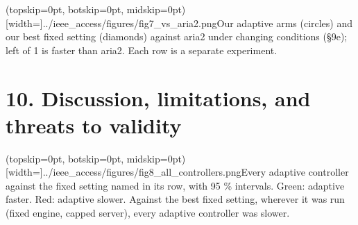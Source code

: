 \documentclass{ieeeaccess}
\begin{document}
\Figure[t!](topskip=0pt, botskip=0pt, midskip=0pt)[width=\columnwidth]{../ieee_access/figures/fig7_vs_aria2.png}{Our adaptive arms (circles) and our best fixed setting (diamonds) against aria2 under changing conditions (§9e); left of 1 is faster than aria2. Each row is a separate experiment.}

\section*{10. Discussion, limitations, and threats to validity}

\Figure[t!](topskip=0pt, botskip=0pt, midskip=0pt)[width=\columnwidth]{../ieee_access/figures/fig8_all_controllers.png}{Every adaptive controller against the fixed setting named in its row, with 95 \% intervals. Green: adaptive faster. Red: adaptive slower. Against the best fixed setting, wherever it was run (fixed engine, capped server), every adaptive controller was slower.}
\end{document}
